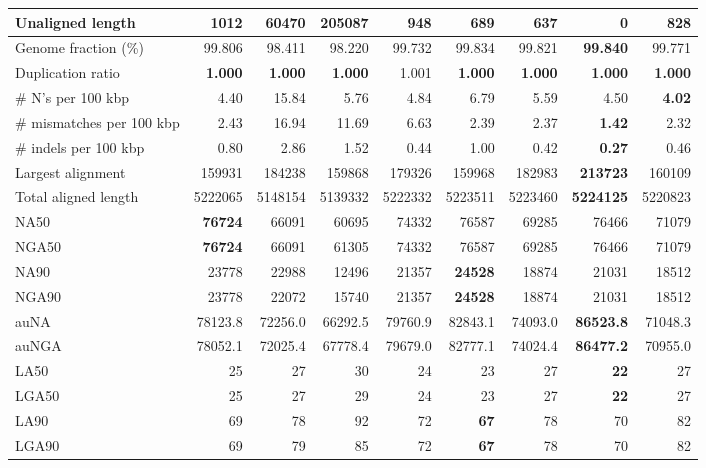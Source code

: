 \documentclass[12pt,a4paper]{article}
\begin{document}
\begin{table}[ht]
\begin{center}
\begin{tabular}{|l*{8}{|r}|}
Unaligned length & 1012 & 60470 & 205087 & 948 & 689 & 637 & {\bf 0} & 828 \\ \hline
Genome fraction (\%) & 99.806 & 98.411 & 98.220 & 99.732 & 99.834 & 99.821 & {\bf 99.840} & 99.771 \\ \hline
Duplication ratio & {\bf 1.000} & {\bf 1.000} & {\bf 1.000} & 1.001 & {\bf 1.000} & {\bf 1.000} & {\bf 1.000} & {\bf 1.000} \\ \hline
\# N's per 100 kbp & 4.40 & 15.84 & 5.76 & 4.84 & 6.79 & 5.59 & 4.50 & {\bf 4.02} \\ \hline
\# mismatches per 100 kbp & 2.43 & 16.94 & 11.69 & 6.63 & 2.39 & 2.37 & {\bf 1.42} & 2.32 \\ \hline
\# indels per 100 kbp & 0.80 & 2.86 & 1.52 & 0.44 & 1.00 & 0.42 & {\bf 0.27} & 0.46 \\ \hline
Largest alignment & 159931 & 184238 & 159868 & 179326 & 159968 & 182983 & {\bf 213723} & 160109 \\ \hline
Total aligned length & 5222065 & 5148154 & 5139332 & 5222332 & 5223511 & 5223460 & {\bf 5224125} & 5220823 \\ \hline
NA50 & {\bf 76724} & 66091 & 60695 & 74332 & 76587 & 69285 & 76466 & 71079 \\ \hline
NGA50 & {\bf 76724} & 66091 & 61305 & 74332 & 76587 & 69285 & 76466 & 71079 \\ \hline
NA90 & 23778 & 22988 & 12496 & 21357 & {\bf 24528} & 18874 & 21031 & 18512 \\ \hline
NGA90 & 23778 & 22072 & 15740 & 21357 & {\bf 24528} & 18874 & 21031 & 18512 \\ \hline
auNA & 78123.8 & 72256.0 & 66292.5 & 79760.9 & 82843.1 & 74093.0 & {\bf 86523.8} & 71048.3 \\ \hline
auNGA & 78052.1 & 72025.4 & 67778.4 & 79679.0 & 82777.1 & 74024.4 & {\bf 86477.2} & 70955.0 \\ \hline
LA50 & 25 & 27 & 30 & 24 & 23 & 27 & {\bf 22} & 27 \\ \hline
LGA50 & 25 & 27 & 29 & 24 & 23 & 27 & {\bf 22} & 27 \\ \hline
LA90 & 69 & 78 & 92 & 72 & {\bf 67} & 78 & 70 & 82 \\ \hline
LGA90 & 69 & 79 & 85 & 72 & {\bf 67} & 78 & 70 & 82 \\ \hline
\end{tabular}
\end{center}
\end{table}
\end{document}
